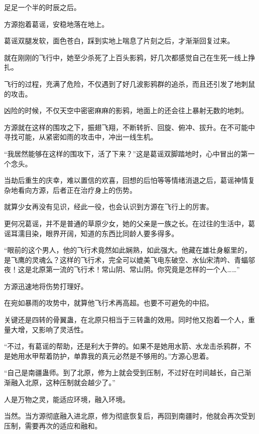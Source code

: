 
\begin{this_body}

足足一个半的时辰之后。

方源抱着葛谣，安稳地落在地上。

葛谣双腿发软，面色苍白，踩到实地上喘息了片刻之后，才渐渐回复过来。

就在刚刚的飞行中，她至少杀死了上百头影鸦，好几次都感觉自己在生死一线上挣扎。

飞行的过程，充满了危险，不仅遇到了好几波影鸦群的追杀，而且还引发了地刺鼠的攻击。

凶险的时候，不仅天空中密密麻麻的影鸦，地面上的还会往上暴射无数的地刺。

方源就在这样的围攻之下，振翅飞翔，不断转折、回旋、俯冲、拔升。在不可能中寻找可能，从紧密如雨的攻击中，冲出一线生机。

“我居然能够在这样的围攻下，活了下来？”这是葛谣双脚踏地时，心中冒出的第一个念头。

当劫后重生的庆幸，难以置信的欢喜，回想的后怕等等情绪消退之后，葛谣神情复杂地看向方源，后者正在治疗身上的伤势。

就算少女再没有见识，经此一役，也会认识到方源在飞行上的厉害。

更何况葛谣，并不是普通的草原少女，她的父亲是一族之长。在过往的生活中，葛谣耳濡目染，眼界开阔，知道的东西比同龄人要多得多。

“眼前的这个男人，他的飞行术竟然如此娴熟，如此强大。他藏在雄壮身躯里的，是飞鹰的灵魂么？这样的飞行术，完全可以媲美飞电东破空、水仙宋清吟、青蝠邬夜！这是北原第一流的飞行术！常山阴、常山阴。你究竟是怎样的一个人……”

方源迅速地将伤势打理好。

在宛如暴雨的攻势中，就算他飞行术再高超。也要不可避免的中招。

关键还是四转的骨翼蛊，在北原只相当于三转蛊的效用。同时他又抱着一个人，重量大增，又影响了灵活性。

“不过，有葛谣的帮助，还是利大于弊的。如果不是她用水箭、水龙击杀鸦群，不是她用水甲帮着防护，单靠我的真元必然是不够用的。”方源心思着。

“自己是南疆蛊师。到了北原，修为上就会受到压制，不过好在时间越长，自己渐渐融入北原，这种压制就会越少了。”

人是万物之灵，能适应环境，融入环境。

当然。当方源彻底融入进北原，修为彻底恢复后，再回到南疆时，他就会再次受到压制，需要再次的适应和融和。


\end{this_body}
